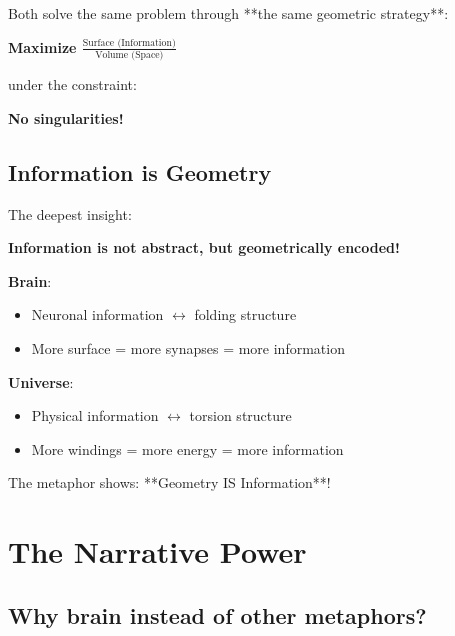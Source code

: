 	Both solve the same problem through **the same geometric strategy**:
	
	\begin{center}
		
		\textbf{Maximize $\frac{\text{Surface (Information)}}{\text{Volume (Space)}}$}
		
		\normalsize
		under the constraint:
		
		
		\textbf{No singularities!}
	\end{center}
	
	\subsection{Information is Geometry}
	
	The deepest insight:
	
	\begin{revolutionary}[Information = Geometry]
		\textbf{Information is not abstract, but geometrically encoded!}
		
		\vspace{0.3cm}
		
		\textbf{Brain}:
		\begin{itemize}
			\item Neuronal information $\leftrightarrow$ folding structure
			\item More surface = more synapses = more information
		\end{itemize}
		
		\textbf{Universe}:
		\begin{itemize}
			\item Physical information $\leftrightarrow$ torsion structure
			\item More windings = more energy = more information
		\end{itemize}
		
		\vspace{0.3cm}
		
		The metaphor shows: **Geometry IS Information**!
	\end{revolutionary}
	
	\section{The Narrative Power}
	
	\subsection{Why brain instead of other metaphors?}
	
